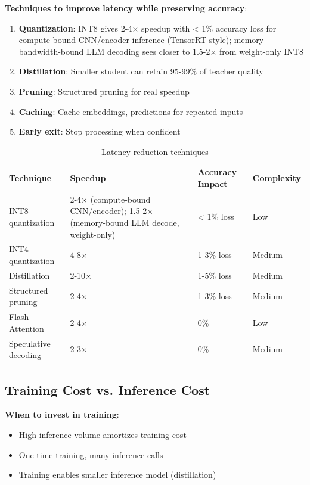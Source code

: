 \textbf{Techniques to improve latency while preserving accuracy}:
\begin{enumerate}
    \item \textbf{Quantization}: INT8 gives 2-4× speedup with < 1\% accuracy loss for compute-bound CNN/encoder inference (TensorRT-style); memory-bandwidth-bound LLM decoding sees closer to 1.5-2× from weight-only INT8
    \item \textbf{Distillation}: Smaller student can retain 95-99\% of teacher quality
    \item \textbf{Pruning}: Structured pruning for real speedup
    \item \textbf{Caching}: Cache embeddings, predictions for repeated inputs
    \item \textbf{Early exit}: Stop processing when confident
\end{enumerate}

\begin{table}[H]
\centering
\caption{Latency reduction techniques}
\begin{tabularx}{\textwidth}{lXXX}
\toprule
\textbf{Technique} & \textbf{Speedup} & \textbf{Accuracy Impact} & \textbf{Complexity} \\
\midrule
INT8 quantization & 2-4× (compute-bound CNN/encoder); 1.5-2× (memory-bound LLM decode, weight-only) & < 1\% loss & Low \\
INT4 quantization & 4-8× & 1-3\% loss & Medium \\
Distillation & 2-10× & 1-5\% loss & Medium \\
Structured pruning & 2-4× & 1-3\% loss & Medium \\
Flash Attention & 2-4× & 0\% & Low \\
Speculative decoding & 2-3× & 0\% & Medium \\
\bottomrule
\end{tabularx}
\end{table}

\subsection{Training Cost vs. Inference Cost}

\textbf{When to invest in training}:
\begin{itemize}
    \item High inference volume amortizes training cost
    \item One-time training, many inference calls
    \item Training enables smaller inference model (distillation)
\end{itemize}

